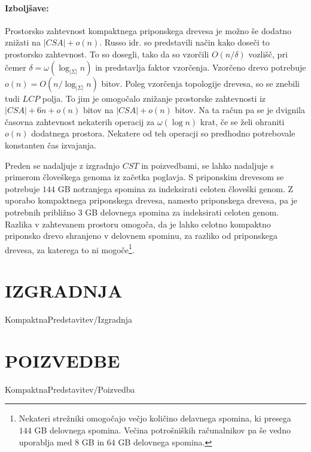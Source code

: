 \paragraph{Izboljšave:}
Prostorsko zahtevnost kompaktnega priponskega drevesa je možno še dodatno znižati na $|CSA|+o(n)$. Russo idr. \cite{Russo2008} so predstavili način kako doseči to prostorsko zahtevnost. To so dosegli, tako da so vzorčili $O(n/\delta)$ vozlišč, pri čemer $\delta=\omega(\log_{|\Sigma|}{n})$ in predstavlja faktor vzorčenja. Vzorčeno drevo potrebuje $o(n)=O(n/\log_{|\Sigma|}{n})$ bitov. Poleg vzorčenja topologije drevesa, so se znebili tudi $LCP$ polja. To jim je omogočalo znižanje prostorske zahtevnosti iz $|CSA|+6n+o(n)$ bitov na $|CSA|+o(n)$ bitov. Na ta račun pa se je dvignila časovna zahtevnost nekaterih operacij za $\omega(\log{n})$ krat, če se želi ohraniti $o(n)$ dodatnega prostora. Nekatere od teh operacji so predhodno potrebovale konstanten čas izvajanja.

Preden se nadaljuje z izgradnjo $CST$ in poizvedbami, se lahko nadaljuje s primerom človeškega genoma iz začetka poglavja. S priponskim drevesom se potrebuje $144$ GB notranjega spomina za indeksirati celoten človeški genom. Z  uporabo kompaktnega priponskega drevesa, namesto priponskega drevesa, pa je potrebnih približno $3$ GB delovnega spomina za indeksirati celoten genom. Razlika v zahtevanem prostoru omogoča, da je lahko celotno kompaktno priponsko drevo shranjeno v delovnem spominu, za razliko od priponskega drevesa, za katerega to ni mogoče\footnote{Nekateri strežniki omogočajo večjo količino delavnega spomina, ki presega $144$ GB delovnega spomina. Večina potrošniških računalnikov pa še vedno uporablja med $8$ GB in $64$ GB delovnega spomina.}.

\section{IZGRADNJA}\label{sec:CSTizgradnja}
{KompaktnaPredstavitev/Izgradnja}

\section{POIZVEDBE}\label{sec:CSTpoizvedba}
{KompaktnaPredstavitev/Poizvedba}


